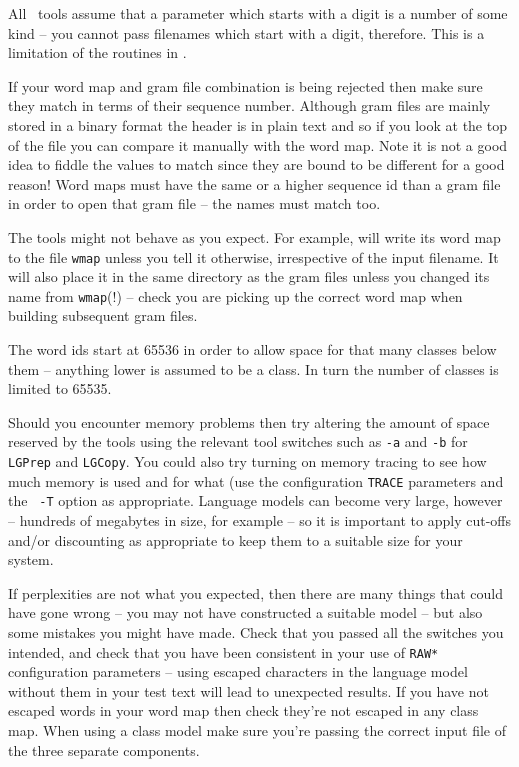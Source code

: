 All \HTK\ tools assume that a parameter which starts with a digit is a
number of some kind -- you cannot pass filenames which start with a
digit, therefore.  This is a limitation of the routines in
. 

If your word map and gram file combination is being rejected then make
sure they match in terms of their sequence number.  Although gram
files are mainly stored in a binary format the header is in plain text
and so if you look at the top of the file you can compare it
manually with the word map.  Note it is not a good idea to fiddle the
values to match since they are bound to be different for a good
reason!  Word maps must have the same or a higher sequence id than a
gram file in order to open that gram file -- the names must match too.

The tools might not behave as you expect.  For example, 
will write its word map to the file {\tt wmap} unless you tell it
otherwise, irrespective of the input filename.  It will also place it
in the same directory as the gram files unless you changed its name
from {\tt wmap}(!) -- check you are picking up the correct word map
when building subsequent gram files.

The word ids start at 65536 in order to allow space for that many
classes below them -- anything lower is assumed to be a class.  In
turn the number of classes is limited to 65535.

Should you encounter memory problems then try altering the amount of
space reserved by the tools using the relevant tool switches such as
{\tt -a} and {\tt -b} for {\tt LGPrep} and {\tt LGCopy}.  You could
also try turning on memory tracing to see how much memory is used and
for what (use the configuration {\tt TRACE} parameters and the {\tt
-T} option as appropriate.  Language models can become very large,
however -- hundreds of megabytes in size, for example -- so it is
important to apply cut-offs and/or discounting as appropriate to keep
them to a suitable size for your system.

If perplexities are not what you expected, then there are many things
that could have gone wrong -- you may not have constructed a suitable
model -- but also some mistakes you might have made.  Check that you
passed all the switches you intended, and check that you have been
consistent in your use of {\tt *RAW*} configuration parameters --
using escaped characters in the language model without them in your
test text will lead to unexpected results.  If you have not escaped
words in your word map then check they're not escaped in any class
map.  When using a class model make sure you're passing the correct
input file of the three separate components.

